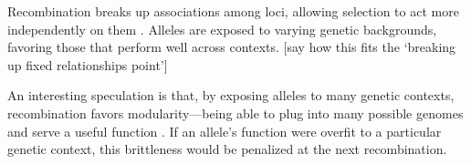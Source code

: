\documentclass[11pt]{article}
\begin{document}
Recombination breaks up associations among loci, allowing selection to act more independently on them \citep{felsenstein1974evolutionary}. Alleles are exposed to varying genetic backgrounds, favoring those that perform well across contexts. [say how this fits the `breaking up fixed relationships point']

An interesting speculation is that, by exposing alleles to many genetic contexts, recombination favors modularity---being able to plug into many possible genomes and serve a useful function \citep{livnat2008mixability,livnat2010sex}. If an allele's function were overfit to a particular genetic context, this brittleness would be penalized at the next recombination. 







\end{document}

